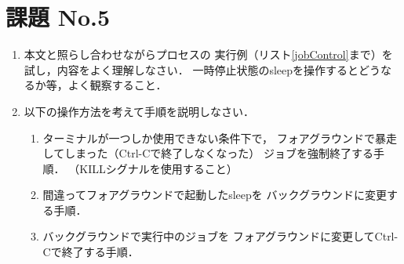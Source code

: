 \section*{課題 No.5}
\begin{enumerate}
\item 本文と照らし合わせながらプロセスの
実行例（リスト\ref{jobControl}まで）を試し，内容をよく理解しなさい．
一時停止状態のsleepを操作するとどうなるか等，よく観察すること．

\item 以下の操作方法を考えて手順を説明しなさい．

\begin{enumerate}
\item ターミナルが一つしか使用できない条件下で，
フォアグラウンドで暴走してしまった（Ctrl-Cで終了しなくなった）
ジョブを強制終了する手順．
（KILLシグナルを使用すること）

\item 間違ってフォアグラウンドで起動したsleepを
バックグラウンドに変更する手順．

\item バックグラウンドで実行中のジョブを
フォアグラウンドに変更してCtrl-Cで終了する手順．
\end{enumerate}

\end{enumerate}
